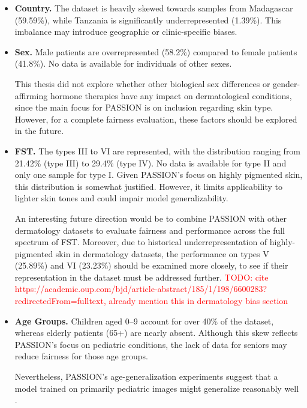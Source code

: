 \documentclass[12pt, a4paper, oneside]{book}   	%
\renewcommand{\todo}[1]{\textcolor{red}{TODO: #1}}
\begin{document}
		\begin{itemize}
			\item \textbf{Country.} The dataset is heavily skewed towards samples from Madagascar (59.59\%), while Tanzania is significantly underrepresented (1.39\%). This imbalance may introduce geographic or clinic-specific biases.
			
			\item \textbf{Sex.} Male patients are overrepresented (58.2\%) compared to female patients (41.8\%). No data is available for individuals of other sexes.
			
			This thesis did not explore whether other biological sex differences or gender-affirming hormone therapies have any impact on dermatological conditions, since the main focus for PASSION is on inclusion regarding skin type. However, for a complete fairness evaluation, these factors should be explored in the future.
			
			\item \textbf{\gls{FST}.} The types III to VI are represented, with the distribution ranging from 21.42\% (type III) to 29.4\% (type IV). No data is available for type II and only one sample for type I.  Given PASSION's focus on highly pigmented skin, this distribution is somewhat justified. However, it limits applicability to lighter skin tones and could impair model generalizability. 
			
			An interesting future direction would be to combine PASSION with other dermatology datasets to evaluate fairness and performance across the full spectrum of \gls{FST}. Moreover, due to historical underrepresentation of highly-pigmented skin in dermatology datasets, the performance on types V (25.89\%) and VI (23.23\%) should be examined more closely, to see if their representation in the dataset must be addressed further.
			\todo{cite https://academic.oup.com/bjd/article-abstract/185/1/198/6600283?redirectedFrom=fulltext, already mention this in dermatology bias section}
			
			
			\item \textbf{Age Groups.} Children aged 0–9 account for over 40\% of the dataset, whereas elderly patients (65+) are nearly absent. Although this skew reflects PASSION’s focus on \gls{pediatric} conditions, the lack of data for seniors may reduce fairness for those age groups.
			
			Nevertheless, PASSION's age-generalization experiments suggest that a model trained on primarily \gls{pediatric} images might generalize reasonably well \autocite{Gottfrois2024}.
			

\end{itemize}
\end{document}
